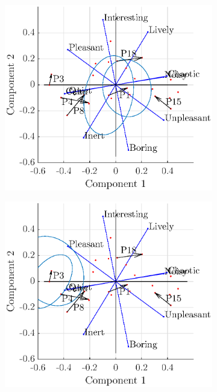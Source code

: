 \documentclass[11pt,a4paper]{article}
\begin{document}
\begin{figure}[h]
    \centering
     \begin{subfigure}[t]{0.45\textwidth}
        \centering
        \includegraphics[width=\textwidth]{figures/pca_p1.eps}
    \end{subfigure}%
    \begin{subfigure}[t]{0.45\textwidth}
        \centering
        \includegraphics[width=\textwidth]{figures/pca_p3.eps}
    \end{subfigure}
\end{figure}
\end{document}
